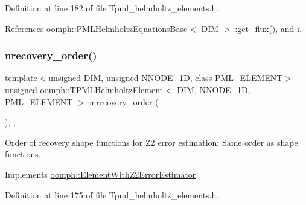 Definition at line 182 of file Tpml\+\_\+helmholtz\+\_\+elements.\+h.



References oomph\+::\+P\+M\+L\+Helmholtz\+Equations\+Base$<$ D\+I\+M $>$\+::get\+\_\+flux(), and i.

\mbox{\label{classoomph_1_1TPMLHelmholtzElement_a814d0a7d186f7986d9d99939ca26fc2d}} 
\subsubsection{\texorpdfstring{nrecovery\+\_\+order()}{nrecovery\_order()}}
{\footnotesize\ttfamily template$<$unsigned D\+IM, unsigned N\+N\+O\+D\+E\+\_\+1D, class P\+M\+L\+\_\+\+E\+L\+E\+M\+E\+NT$>$ \\
unsigned \hyperlink{classoomph_1_1TPMLHelmholtzElement}{oomph\+::\+T\+P\+M\+L\+Helmholtz\+Element}$<$ D\+IM, N\+N\+O\+D\+E\+\_\+1D, P\+M\+L\+\_\+\+E\+L\+E\+M\+E\+NT $>$\+::nrecovery\+\_\+order (\begin{DoxyParamCaption}{ }\end{DoxyParamCaption})\hspace{0.3cm}{\ttfamily [inline]}, {\ttfamily [protected]}, {\ttfamily [virtual]}}



Order of recovery shape functions for Z2 error estimation\+: Same order as shape functions. 



Implements \hyperlink{classoomph_1_1ElementWithZ2ErrorEstimator_af39480835bd3e0f6b2f4f7a9a4044798}{oomph\+::\+Element\+With\+Z2\+Error\+Estimator}.



Definition at line 175 of file Tpml\+\_\+helmholtz\+\_\+elements.\+h.

\mbox{\label{classoomph_1_1TPMLHelmholtzElement_acbab5e3abc283ce69dda34f9a039f60f}} 
